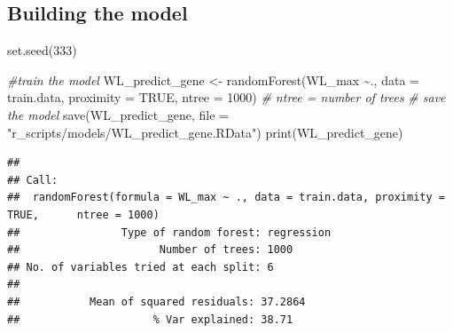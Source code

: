 \documentclass[
]{article}
\newenvironment{Shaded}{\begin{snugshade}}{\end{snugshade}}
\newcommand{\AttributeTok}[1]{\textcolor[rgb]{0.77,0.63,0.00}{#1}}
\newcommand{\CommentTok}[1]{\textcolor[rgb]{0.56,0.35,0.01}{\textit{#1}}}
\newcommand{\ConstantTok}[1]{\textcolor[rgb]{0.00,0.00,0.00}{#1}}
\newcommand{\DecValTok}[1]{\textcolor[rgb]{0.00,0.00,0.81}{#1}}
\newcommand{\FunctionTok}[1]{\textcolor[rgb]{0.00,0.00,0.00}{#1}}
\newcommand{\NormalTok}[1]{#1}
\newcommand{\OtherTok}[1]{\textcolor[rgb]{0.56,0.35,0.01}{#1}}
\newcommand{\SpecialCharTok}[1]{\textcolor[rgb]{0.00,0.00,0.00}{#1}}
\newcommand{\StringTok}[1]{\textcolor[rgb]{0.31,0.60,0.02}{#1}}
\begin{document}
\begin{Shaded}
\end{Shaded}

\hypertarget{building-the-model}{%
\subsection{Building the model}\label{building-the-model}}

\begin{Shaded}
\begin{Highlighting}[]
\FunctionTok{set.seed}\NormalTok{(}\DecValTok{333}\NormalTok{)}


\CommentTok{\#train the model}
\NormalTok{WL\_predict\_gene }\OtherTok{\textless{}{-}} \FunctionTok{randomForest}\NormalTok{(WL\_max }\SpecialCharTok{\textasciitilde{}}\NormalTok{., }\AttributeTok{data =}\NormalTok{ train.data, }
                                    \AttributeTok{proximity =} \ConstantTok{TRUE}\NormalTok{, }\AttributeTok{ntree =} \DecValTok{1000}\NormalTok{) }
\CommentTok{\# ntree = number of trees     }
\CommentTok{\# save the model }
\FunctionTok{save}\NormalTok{(WL\_predict\_gene, }\AttributeTok{file =}  \StringTok{"r\_scripts/models/WL\_predict\_gene.RData"}\NormalTok{)}
\FunctionTok{print}\NormalTok{(WL\_predict\_gene)}
\end{Highlighting}
\end{Shaded}

\begin{verbatim}
## 
## Call:
##  randomForest(formula = WL_max ~ ., data = train.data, proximity = TRUE,      ntree = 1000) 
##                Type of random forest: regression
##                      Number of trees: 1000
## No. of variables tried at each split: 6
## 
##           Mean of squared residuals: 37.2864
##                     % Var explained: 38.71
\end{verbatim}
\end{document}
